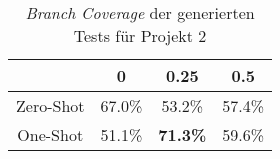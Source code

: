 \bgroup
\def\arraystretch{2}
\begin{table}[H]
	\vspace{.5cm}
	\centering		
	\begin{center}
		\begin{tabular}{|c||c|c|c|}
			\hline 
			& 0 & 0.25 & 0.5 \\
			\hline 
			\hline
			Zero-Shot & 67.0\% & 53.2\% & 57.4\% \\
			\hline
			One-Shot & 51.1\% & \textbf{71.3\%} & 59.6\% \\
			\hline
		\end{tabular} 
	\end{center}
	\caption{\textit{Branch Coverage} der generierten Tests für Projekt 2}
	\label{fig:branch-2}
	\vspace{-.8cm}
\end{table}
\egroup